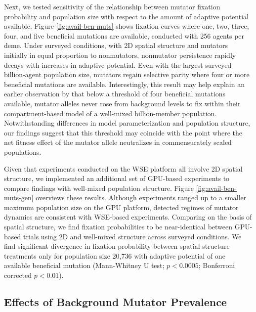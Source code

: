 Next, we tested sensitivity of the relationship between mutator fixation probability and population size with respect to the amount of adaptive potential available.
Figure \ref{fig:avail-ben-muts} shows fixation curves where one, two, three, four, and five beneficial mutations are available, conducted with 256 agents per deme.
Under surveyed conditions, with 2D spatial structure and mutators initially in equal proportion to nonmutators, nonmutator persistence rapidly decays with increases in adaptive potential.
Even with the largest surveyed billion-agent population size, mutators regain selective parity where four or more beneficial mutations are available.
Interestingly, this result may help explain an earlier observation by \citet{tenaillon1999mutators} that below a threshold of four beneficial mutations available, mutator alleles never rose from background levels to fix within their compartment-based model of a well-mixed billion-member population.
Notwithstanding differences in model parameterization and population structure, our findings suggest that this threshold may coincide with the point where the net fitness effect of the mutator allele neutralizes in commensurately scaled populations.



Given that experiments conducted on the WSE platform all involve 2D spatial structure, we implemented an additional set of GPU-based experiments to compare findings with well-mixed population structure.
Figure \ref{fig:avail-ben-muts-gen} overviews these results.
Although experiments ranged up to a smaller maximum population size on the GPU platform, detected regimes of mutator dynamics are consistent with WSE-based experiments.
Comparing on the basis of spatial structure, we find fixation probabilities to be near-identical between GPU-based trials using 2D and well-mixed structure across surveyed conditions.
We find significant divergence in fixation probability between spatial structure treatments only for population size 20,736 with adaptive potential of one available beneficial mutation (Mann-Whitney U test; $p < 0.0005$; Bonferroni corrected $p < 0.01$).

\subsection{Effects of Background Mutator Prevalence}
\label{sec:background-hypermutator-prevalence}

